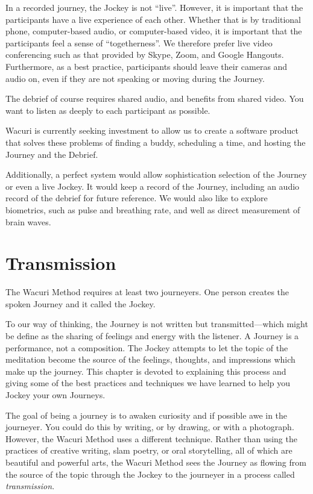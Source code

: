 \documentclass[12pt]{book}
\begin{document}
In a recorded journey, the Jockey is not ``live''. However, it is
important that the participants have a live experience of each other.
Whether that is by traditional phone, computer-based audio, or computer-based
video, it is important that the participants feel a sense of ``togetherness''.
We therefore prefer live video conferencing such as that provided by Skype,
Zoom, and Google Hangouts. Furthermore, as a best practice, participants
should leave their cameras and audio on, even if they are not speaking or
moving during the Journey.

The debrief of course requires shared audio, and benefits from shared video.
You want to listen as deeply to each participant as possible.

Wacuri is currently seeking investment to allow us to create a software
product that solves these problems of finding a buddy, scheduling a time,
and hosting the Journey and the Debrief.

Additionally, a perfect system would allow sophistication selection of
the Journey or even a live Jockey. It would keep a record of the Journey,
including an audio record of the debrief for future reference. We would
also like to explore biometrics, such as pulse and breathing rate, and
well as direct measurement of brain waves.


\chapter{Transmission}


The Wacuri Method requires at least two journeyers. One person creates the spoken Journey and it called the Jockey.
					
To our way of thinking, the Journey is not written but transmitted---which
might be define as the sharing of feelings and energy with the listener. A Journey is a performance, not a composition.
The Jockey attempts to let the topic of the meditation become the source of the feelings, thoughts,
and impressions which make up the journey.
This chapter is devoted to explaining this process and giving some of the best practices
and techniques we have learned to help you Jockey your own Journeys.
					
The goal of being a journey is to awaken curiosity and if possible awe in the journeyer.
You could do this by writing, or by drawing, or with a photograph.
However, the Wacuri Method uses a different technique. Rather than using the practices of creative writing,
slam poetry, or oral storytelling, all of which are beautiful and powerful arts, the Wacuri Method sees the Journey
as flowing from the source of the topic through the Jockey to the journeyer in a process called {\em transmission}.
					
\end{document}
